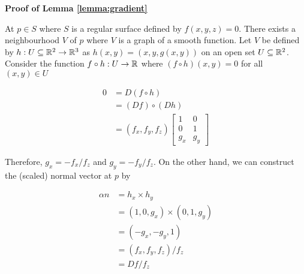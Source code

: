\documentclass{article}
\begin{document}
\textbf{Proof of Lemma \ref{lemma:gradient}}

At $p \in S$ where $S$ is a regular surface defined by $f(x, y, z) = 0$. There exists a neighbourhood $V$ of $p$ where $V$ is a graph of a smooth function. Let $V$ be defined by $h: U \subseteq \mathbb{R}^2 \to \mathbb{R}^3$ as $h(x, y) = (x, y, g(x, y))$ on an open set $U \subseteq \mathbb{R}^2$. Consider the function $f \circ h: U \to \mathbb{R}$ where $(f \circ h)(x, y) = 0$ for all $(x, y) \in U$

\begin{align*}
    0
    &= D(f \circ h) \\
    &= (Df) \circ (Dh) \\
    &= (f_x, f_y, f_z) \begin{bmatrix}
    1 & 0\\
    0 & 1\\
    g_x & g_y
    \end{bmatrix}
\end{align*}

Therefore, $g_x = -f_x / f_z$ and $g_y = - f_y / f_z$. On the other hand, we can construct the (scaled) normal vector at $p$ by

\begin{align*}
    \alpha n
    &= h_x \times h_y \\
    &= (1, 0, g_x) \times (0, 1, g_y) \\
    &= (-g_x, -g_y, 1) \\
    &= (f_x, f_y, f_z) / f_z \\
    &= Df / f_z
\end{align*}
\end{document}
